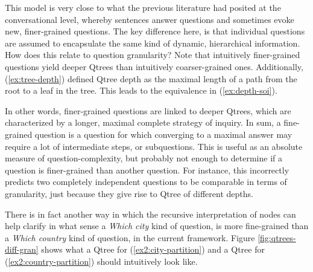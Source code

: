 This model is very close to what the previous literature had posited at the conversational level, whereby sentences answer questions and sometimes evoke new, finer-grained questions. The key difference here, is that individual questions are assumed to encapsulate the same kind of dynamic, hierarchical information. How does this relate to question granularity? Note that intuitively finer-grained questions yield deeper Qtrees than intuitively coarser-grained ones. Additionally, (\ref{ex:tree-depth}) defined Qtree depth as the maximal length of a path from the root to a leaf in the tree. This leads to the equivalence in (\ref{ex:depth-soi}).

\begin{exe}
	\label{ex:depth-soi}
\end{exe}

In other words, finer-grained questions are linked to deeper Qtrees, which are characterized by a longer, maximal complete strategy of inquiry. In sum, a fine-grained question is a question for which converging to a maximal answer may require a lot of intermediate steps, or subquestions. This is useful as an absolute measure of question-complexity, but probably not enough to determine if a question is finer-grained than another question. For instance, this incorrectly predicts two completely independent questions to be comparable in terms of granularity, just because they give rise to Qtree of different depths. 



There is in fact another way in which the recursive interpretation of nodes can help clarify in what sense a \textit{Which city} kind of question, is more fine-grained than a \textit{Which country} kind of question, in the current framework. Figure \ref{fig:qtrees-diff-gran} shows what a Qtree for (\ref{ex2:city-partition}) and a Qtree for (\ref{ex2:country-partition}) should intuitively look like. 

